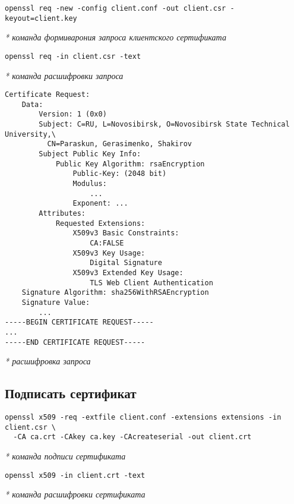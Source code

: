 \documentclass[12pt, a4paper]{article}
\begin{document}
\begin{verbatim}
openssl req -new -config client.conf -out client.csr -keyout=client.key
\end{verbatim}
\textit{* команда формиварония запроса клиентского сертификата}

\begin{verbatim}
openssl req -in client.csr -text 
\end{verbatim}
\textit{* команда расшифровки запроса}

\begin{verbatim}
Certificate Request:
    Data:
        Version: 1 (0x0)
        Subject: C=RU, L=Novosibirsk, O=Novosibirsk State Technical University,\
          CN=Paraskun, Gerasimenko, Shakirov
        Subject Public Key Info:
            Public Key Algorithm: rsaEncryption
                Public-Key: (2048 bit)
                Modulus:
                    ...
                Exponent: ...
        Attributes:
            Requested Extensions:
                X509v3 Basic Constraints:
                    CA:FALSE
                X509v3 Key Usage:
                    Digital Signature
                X509v3 Extended Key Usage:
                    TLS Web Client Authentication
    Signature Algorithm: sha256WithRSAEncryption
    Signature Value:
        ...
-----BEGIN CERTIFICATE REQUEST-----
...
-----END CERTIFICATE REQUEST-----
\end{verbatim}
\textit{* расшифровка запроса}

\subsection{Подписать сертификат}

\begin{verbatim}
openssl x509 -req -extfile client.conf -extensions extensions -in client.csr \
  -CA ca.crt -CAkey ca.key -CAcreateserial -out client.crt
\end{verbatim}
\textit{* команда подписи сертификата}

\begin{verbatim}
openssl x509 -in client.crt -text 
\end{verbatim}
\textit{* команда расшифровки сертификата}
\end{document}
